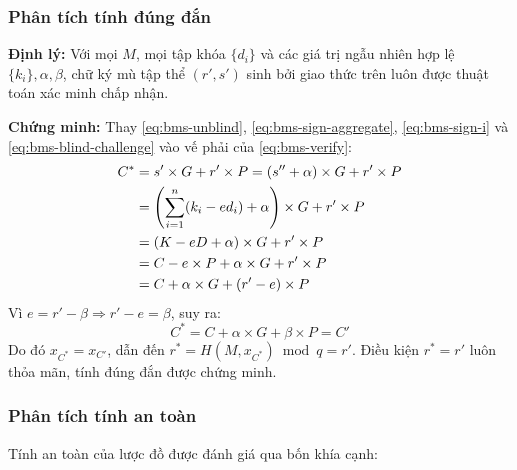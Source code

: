 \subsubsection{Phân tích tính đúng đắn}

\textbf{Định lý:} Với mọi $M$, mọi tập khóa $\{d_i\}$ và các giá trị ngẫu nhiên hợp lệ $\{k_i\}, \alpha, \beta$, chữ ký mù tập thể $(r', s')$ sinh bởi giao thức trên luôn được thuật toán xác minh chấp nhận.

\textbf{Chứng minh:} Thay \eqref{eq:bms-unblind}, \eqref{eq:bms-sign-aggregate}, \eqref{eq:bms-sign-i} và \eqref{eq:bms-blind-challenge} vào vế phải của \eqref{eq:bms-verify}:
\begin{align}
    C^* &= s' \times G + r' \times P = (s'' + \alpha) \times G + r' \times P \notag \\
        &= \left( \sum_{i=1}^{n} (k_i - e d_i) + \alpha \right) \times G + r' \times P \notag \\
        &= (K - eD + \alpha) \times G + r' \times P \notag \\
        &= C - e \times P + \alpha \times G + r' \times P \notag \\
        &= C + \alpha \times G + (r' - e) \times P
        \label{eq:bms-proof-1}
\end{align}
Vì $e = r' - \beta \Rightarrow r' - e = \beta$, suy ra:
\begin{equation}
    C^* = C + \alpha \times G + \beta \times P = C'
    \label{eq:bms-proof-2}
\end{equation}
Do đó $x_{C^*} = x_{C'}$, dẫn đến $r^* = H(M, x_{C^*}) \bmod q = r'$. Điều kiện $r^* = r'$ luôn thỏa mãn, tính đúng đắn được chứng minh.
\subsubsection{Phân tích tính an toàn}

Tính an toàn của lược đồ được đánh giá qua bốn khía cạnh:

